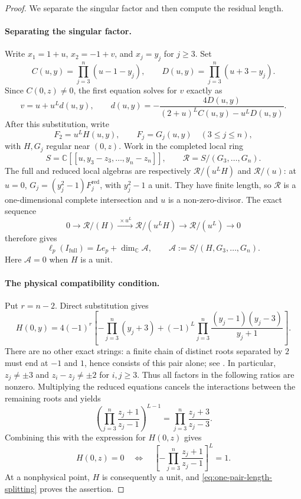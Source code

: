 \documentclass[11pt]{article}
\theoremstyle{definition}
\newcommand{\C}{\mathbb C}
\begin{document}
\begin{proof}
We separate the singular factor and then compute the residual length.

\paragraph{Separating the singular factor.}
Write $x_1=1+u$, $x_2=-1+v$, and $x_j=y_j$ for $j\ge3$.
Set
\[
 C(u,y)=\prod_{j=3}^n(u-1-y_j),\qquad
 D(u,y)=\prod_{j=3}^n(u+3-y_j).
\]
Since $C(0,z)\ne0$, the first equation solves for $v$ exactly as
\[
 v=u+u^Ld(u,y),\qquad
 d(u,y)=-\frac{4D(u,y)}{(2+u)^LC(u,y)-u^LD(u,y)}.
\]
After this substitution, write
\[
 F_2=u^LH(u,y),\qquad F_j=G_j(u,y)\quad(3\le j\le n),
\]
with $H,G_j$ regular near $(0,z)$. Work in the completed local ring
\[
 S=\C[[u,y_3-z_3,\ldots,y_n-z_n]],\qquad
 \mathcal R=S/(G_3,\ldots,G_n).
\]
The full and reduced local algebras
are respectively $\mathcal R/(u^LH)$ and $\mathcal R/(u)$: at $u=0$,
$G_j=(y_j^2-1)F_j^{\mathrm{red}}$, with $y_j^2-1$ a unit.
They have finite length, so $\mathcal R$ is a one-dimensional complete
intersection and $u$ is a non-zero-divisor. The exact sequence
\[
 0\longrightarrow\mathcal R/(H)
 \xrightarrow{\ \times u^L\ }\mathcal R/(u^LH)
 \longrightarrow\mathcal R/(u^L)\longrightarrow0
\]
therefore gives
\begin{equation}\label{eq:one-pair-length-splitting}
 \ell_p(I_{\mathrm{full}})
 =Le_p+\dim_\C\mathcal A,\qquad
 \mathcal A:=S/(H,G_3,\ldots,G_n).
\end{equation}
Here $\mathcal A=0$ when $H$ is a unit.

\paragraph{The physical compatibility condition.}
Put $r=n-2$. Direct substitution gives
\[
 H(0,y)=4(-1)^r\left[
 -\prod_{j=3}^n(y_j+3)
 +(-1)^L\prod_{j=3}^n
             \frac{(y_j-1)(y_j-3)}{y_j+1}\right].
\]
There are no other exact strings: a finite chain of distinct roots
separated by $2$ must end at $-1$ and $1$, hence consists of this pair
alone; see \cite[Lemma~1]{GJ2020}. In particular, $z_j\ne\pm3$
and $z_i-z_j\ne\pm2$ for $i,j\ge3$. Thus all factors in the
following ratios are nonzero. Multiplying the reduced equations
cancels the interactions between the remaining roots and yields
\[
 \left(\prod_{j=3}^n\frac{z_j+1}{z_j-1}\right)^{L-1}
 =\prod_{j=3}^n\frac{z_j+3}{z_j-3}.
\]
Combining this with the expression for $H(0,z)$ gives
\begin{equation}\label{eq:one-pair-compatibility}
 H(0,z)=0
 \quad\Longleftrightarrow\quad
 \left[-\prod_{j=3}^n\frac{z_j+1}{z_j-1}\right]^L=1.
\end{equation}
At a nonphysical point, $H$ is consequently a unit, and
\eqref{eq:one-pair-length-splitting} proves the assertion.


\end{proof}
\end{document}
